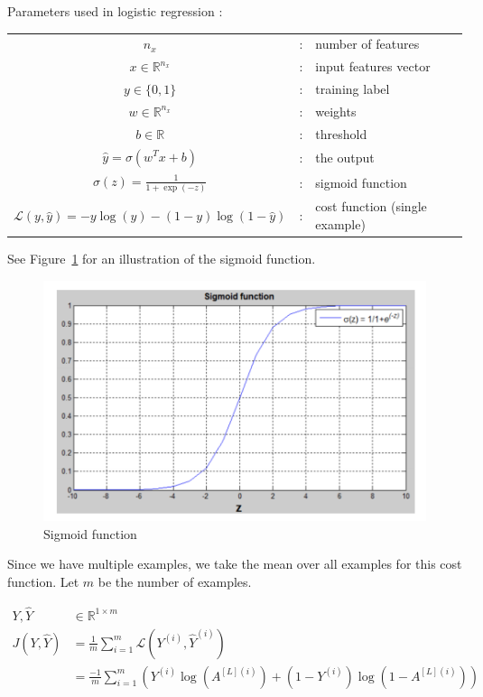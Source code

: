 Parameters used in logistic regression :
\vspace{0.5cm}

{
\renewcommand{\arraystretch}{1.5}
\begin{tabular}{ccl}
	$n_x$ & : &  number of features \\
	$x\in\mathbb{R}^{n_x}$ & : & input features vector \\
	$y\in\{0,1\}$ & : & training label \\
	$w\in\mathbb{R}^{n_x}$ & : & weights \\
	$b\in\mathbb{R}$ & : & threshold \\
	$\hat{y} = \sigma(w^T x + b)$ & : & the output \\
	$\sigma(z) = \frac{1}{1+\exp(-z)}$ & : & sigmoid function \\
	$\mathcal{L}(y,\hat{y}) = -y \log(\hat{y}) - (1-y) \log(1-\hat{y})$ & :& cost function (single example)
\end{tabular} 
}

See Figure~\ref{fig:sigmoid} for an illustration of the sigmoid function.

\begin{figure}[h]
	\centering
	\includegraphics[scale=0.5]{sigmoid_function.png}
	\caption{\label{fig:sigmoid}Sigmoid function}
\end{figure}

Since we have multiple examples, we take the mean over all examples for this cost function.
Let $m$ be the number of examples.

\begin{align}
	Y,\hat{Y}&\in\mathbb{R}^{1\times m} \\
	J(Y, \hat{Y})  &= \frac{1}{m} \sum_{i=1}^{m} \mathcal{L}(Y^{(i)},\hat{Y}^{(i)}) \\
	&= \frac{-1}{m} \sum_{i=1}^{m} \left(
	Y^{(i)} \log(A^{[L](i)}) + (1-Y^{(i)}) \log(1 - A^{[L](i)})
	\right)
\end{align}

